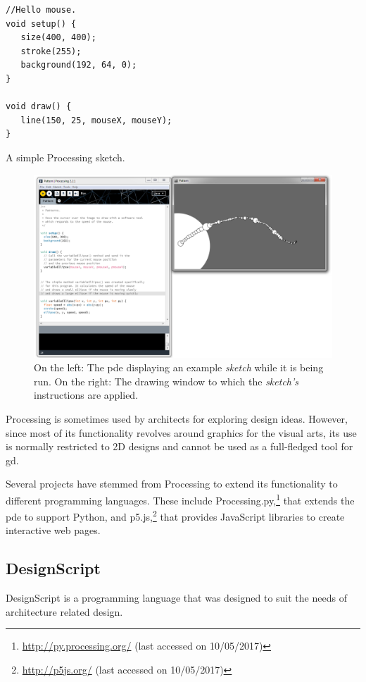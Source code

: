 \begin{listing}
\begin{verbatim}
//Hello mouse.
void setup() {
   size(400, 400);
   stroke(255);
   background(192, 64, 0);
}

void draw() {
   line(150, 25, mouseX, mouseY);
}
\end{verbatim}
	\caption{A simple Processing sketch.}
	\label{lst:simple:processing}
\end{listing}

\begin{figure}
	\centering
	\includegraphics[width=1.0\textwidth]{images/proc_dev_env}
	\caption{On the left: The \gls{pde} displaying an example \emph{sketch} while it is being run. On the right: The drawing window to which the \emph{sketch's} instructions are applied.}
	\label{fig:proc:dev:env}
\end{figure}

Processing is sometimes used by architects for exploring design ideas.
However, since most of its functionality revolves around graphics for the visual arts, its use is normally restricted to 2D designs and cannot be used as a full-fledged tool for \gls{gd}.

Several projects have stemmed from Processing to extend its functionality to different programming languages.
These include Processing.py,\footnote{\url{http://py.processing.org/} (last accessed on 10/05/2017)} that extends the \gls{pde} to support Python, and p5.js,\footnote{\url{http://p5js.org/} (last accessed on 10/05/2017)} that provides JavaScript libraries to create interactive web pages.


\subsection{DesignScript}
\label{section:designscript:related}
DesignScript\cite{aish2012designscript} is a programming language that was designed to suit the needs of architecture related design.

